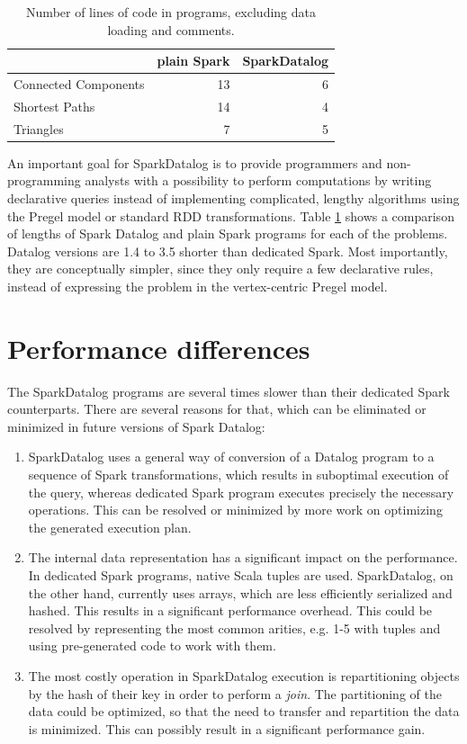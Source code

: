 \begin{table}[h!]
  \centering
\begin{tabular}{l|r|r}
\hline   & plain Spark & SparkDatalog \\ 
\hline
 Connected Components & 13 & 6 \\ 
 Shortest Paths & 14 & 4 \\ 
 Triangles & 7 & 5 \\ 
\hline 
\end{tabular} 
\caption{Number of lines of code in programs, excluding data loading and comments.}
\label{tab_proglen}
\end{table}

An important goal for SparkDatalog is to provide programmers and non-programming analysts with a possibility to perform computations by writing declarative queries instead of implementing complicated, lengthy algorithms using the Pregel model or standard RDD transformations. Table \ref{tab_proglen} shows a comparison of lengths of Spark Datalog and plain Spark programs for each of the problems. Datalog versions are 1.4 to 3.5 shorter than dedicated Spark. Most importantly, they are conceptually simpler, since they only require a few declarative rules, instead of expressing the problem in the vertex-centric Pregel model.

\section{Performance differences}
The SparkDatalog programs are several times slower than their dedicated Spark counterparts. There are several reasons for that, which can be eliminated or minimized in future versions of Spark Datalog:
\begin{enumerate}
\item SparkDatalog uses a general way of conversion of a Datalog program to a sequence of Spark transformations, which results in suboptimal execution of the query, whereas dedicated Spark program executes precisely the necessary operations. This can be resolved or minimized by more work on optimizing the generated execution plan.
\item The internal data representation has a significant impact on the performance. In dedicated Spark programs, native Scala tuples are used. SparkDatalog, on the other hand, currently uses arrays, which are less efficiently serialized and hashed. This results in a significant performance overhead. This could be resolved by representing the most common arities, e.g. 1-5 with tuples and using pre-generated code to work with them.
\item The most costly operation in SparkDatalog execution is repartitioning objects by the hash of their key in order to perform a \emph{join}. The partitioning of the data could be optimized, so that the need to transfer and repartition the data is minimized. This can possibly result in a significant performance gain.
\end{enumerate}

